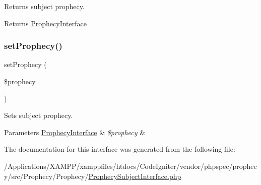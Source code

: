 Returns subject prophecy.

\begin{DoxyReturn}{Returns}
\mbox{\hyperlink{interface_prophecy_1_1_prophecy_1_1_prophecy_interface}{Prophecy\+Interface}} 
\end{DoxyReturn}
\mbox{\label{interface_prophecy_1_1_prophecy_1_1_prophecy_subject_interface_a52e5c2c0a923beb88fc581ce59bc5f96}} 
\subsubsection{\texorpdfstring{set\+Prophecy()}{setProphecy()}}
{\footnotesize\ttfamily set\+Prophecy (\begin{DoxyParamCaption}\item[{\mbox{\hyperlink{interface_prophecy_1_1_prophecy_1_1_prophecy_interface}{Prophecy\+Interface}}}]{\$prophecy }\end{DoxyParamCaption})}

Sets subject prophecy.


\begin{DoxyParams}[1]{Parameters}
\mbox{\hyperlink{interface_prophecy_1_1_prophecy_1_1_prophecy_interface}{Prophecy\+Interface}} & {\em \$prophecy} & \\
\hline
\end{DoxyParams}


The documentation for this interface was generated from the following file\+:\begin{DoxyCompactItemize}
\item 
/\+Applications/\+X\+A\+M\+P\+P/xamppfiles/htdocs/\+Code\+Igniter/vendor/phpspec/prophecy/src/\+Prophecy/\+Prophecy/\mbox{\hyperlink{_prophecy_subject_interface_8php}{Prophecy\+Subject\+Interface.\+php}}\end{DoxyCompactItemize}

